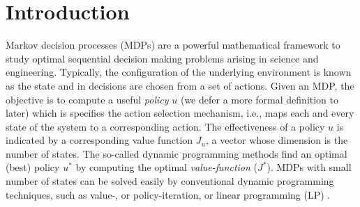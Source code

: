 \section{Introduction}
Markov decision processes (MDPs) are a powerful mathematical framework to study optimal sequential decision making problems arising in science and engineering. Typically, the configuration of the underlying environment is known as the state and in decisions are chosen from a set of actions. Given an MDP, the objective is to compute a useful \emph{policy} $u$ (we defer a more formal definition to later) which is specifies the action selection mechanism, i.e., maps each and every state of the system to a corresponding action. The effectiveness of a policy $u$ is indicated by a corresponding value function $J_u$, a vector whose dimension is the number of states. The so-called dynamic programming methods find an optimal (best) policy $u^*$ by computing the optimal \emph{value-function} ($J^*$). MDPs with small number of states can be solved easily by conventional dynamic programming techniques, such as value-, or policy-iteration, or linear programming (LP) \cite{BertB}.\par

